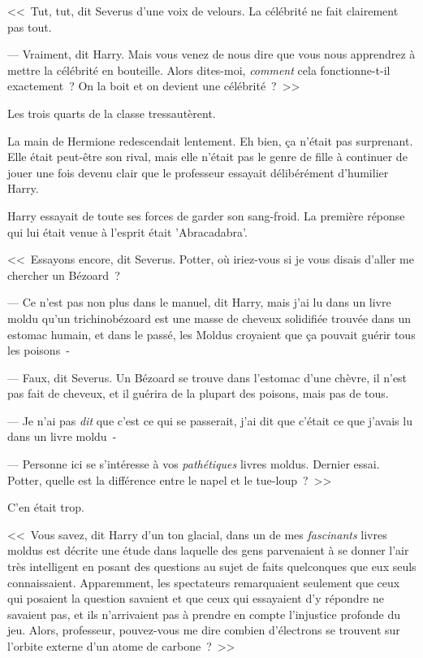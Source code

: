 <<~Tut, tut, dit Severus d'une voix de velours. La célébrité ne fait clairement pas tout.

--- Vraiment, dit Harry. Mais vous venez de nous dire que vous nous apprendrez à mettre la célébrité en bouteille. Alors dites-moi, \emph{comment} cela fonctionne-t-il exactement~? On la boit et on devient une célébrité~?~>>

Les trois quarts de la classe tressautèrent.

La main de Hermione redescendait lentement. Eh bien, ça n'était pas surprenant. Elle était peut-être son rival, mais elle n'était pas le genre de fille à continuer de jouer une fois devenu clair que le professeur essayait délibérément d'humilier Harry.

Harry essayait de toute ses forces de garder son sang-froid. La première réponse qui lui était venue à l'esprit était 'Abracadabra'.

<<~Essayons encore, dit Severus. Potter, où iriez-vous si je vous disais d'aller me chercher un Bézoard~?

--- Ce n'est pas non plus dans le manuel, dit Harry, mais j'ai lu dans un livre moldu qu'un trichinobézoard est une masse de cheveux solidifiée trouvée dans un estomac humain, et dans le passé, les Moldus croyaient que ça pouvait guérir tous les poisons~-

--- Faux, dit Severus. Un Bézoard se trouve dans l'estomac d'une chèvre, il n'est pas fait de cheveux, et il guérira de la plupart des poisons, mais pas de tous.

--- Je n'ai pas \emph{dit} que c'est ce qui se passerait, j'ai dit que c'était ce que j'avais lu dans un livre moldu~-

--- Personne ici se s'intéresse à vos \emph{pathétiques} livres moldus. Dernier essai. Potter, quelle est la différence entre le napel et le tue-loup~?~>>

C'en était trop.

<<~Vous savez, dit Harry d'un ton glacial, dans un de mes \emph{fascinants} livres moldus est décrite une étude dans laquelle des gens parvenaient à se donner l'air très intelligent en posant des questions au sujet de faits quelconques que eux seuls connaissaient. Apparemment, les spectateurs remarquaient seulement que ceux qui posaient la question savaient et que ceux qui essayaient d'y répondre ne savaient pas, et ils n'arrivaient pas à prendre en compte l'injustice profonde du jeu. Alors, professeur, pouvez-vous me dire combien d'électrons se trouvent sur l'orbite externe d'un atome de carbone~?~>>

